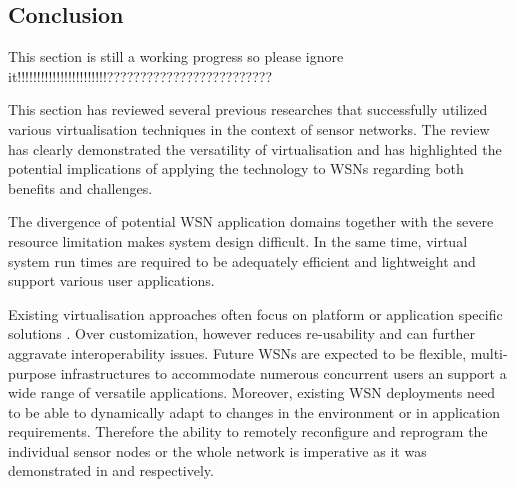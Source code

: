 \subsection{Conclusion}
This section is still a working progress so please ignore it!!!!!!!!!!!!!!!!!!!!!!!?????????????????????????

\bigskip
This section has reviewed several previous researches that successfully utilized various virtualisation techniques in the context of sensor networks. The review has clearly demonstrated the versatility of virtualisation and has highlighted the potential implications of applying the technology to WSNs regarding both benefits and challenges. 

The divergence of potential WSN application domains together with the severe resource limitation makes system design difficult. In the same time, virtual system run times are required to be adequately efficient and lightweight and support various user applications. 

Existing virtualisation approaches often focus on platform \cite{simon2005squawk} or application specific solutions \cite{levis2004bridging}. Over customization, however reduces re-usability and can further aggravate interoperability issues. Future WSNs are expected to be flexible, multi-purpose infrastructures to accommodate numerous concurrent users an support a wide range of versatile applications.  Moreover, existing WSN deployments need to be able to dynamically adapt to changes in the environment or in application requirements. Therefore the ability to remotely reconfigure and reprogram the individual sensor nodes or the whole network is imperative as it was demonstrated in \cite{koshy2005vmstar} and \cite{Michiels:2006:DDA:1176866.1176868} respectively. 

\begin{comment}
content...



The abstraction provided by virtualisation needs to be generic enough to simplify the integration of new functionality or components but in certain cases they have to be optimized to be efficient in specific domains.  

Virtualisation techniques at the different layers of the WSN infrastructure offer functionalities that are unique to the specific layer, however, they do not consider the other layers. 

The virtual machine approaches for example promote application portability and programming simplification, although the byte code interpretation mechanisms introduce computation overhead.

Based on the approaches that were reviewed in this section we identified a number of challenges that have not been fully addressed. This include the following areas:

i)
ii)
iii)

\end{comment}